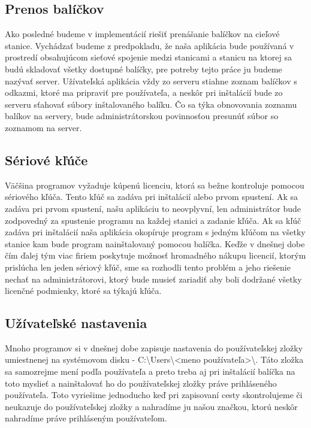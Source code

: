 \subsection{Prenos balíčkov}
Ako posledné budeme v implementácií riešiť prenášanie balíčkov na cieľové stanice. Vychádzať budeme z predpokladu, že naša aplikácia bude používaná v prostredí obsahujúcom sieťové spojenie medzi stanicami a stanicu na ktorej sa budú skladovať všetky dostupné balíčky, pre potreby tejto práce ju budeme nazývať server. Užívateľská aplikácia vždy zo serveru stiahne zoznam balíčkov s odkazmi, ktoré ma pripraviť pre používateľa, a neskôr pri inštalácií bude zo serveru sťahovať súbory inštalovaného balíku. Čo sa týka obnovovania zoznamu balíkov na servery, bude administrátorskou povinnosťou presunúť súbor so zoznamom na server.

\subsection{Sériové kľúče}
Väčšina programov vyžaduje kúpenú licenciu, ktorá sa bežne kontroluje pomocou sériového kľúča. Tento kľúč sa zadáva pri inštalácií alebo prvom spustení. Ak sa zadáva pri prvom spustení, našu aplikáciu to neovplyvní, len administrátor bude zodpovedný za spustenie programu na každej stanici a zadanie kľúča. Ak sa kľúč zadáva pri inštalácií naša aplikácia okopíruje program s jedným kľúčom na všetky stanice kam bude program nainštalovaný pomocou balíčka. Keďže v dnešnej dobe čím ďalej tým viac firiem poskytuje možnosť hromadného nákupu licencií, ktorým prislúcha len jeden sériový kľúč, sme sa rozhodli tento problém a jeho riešenie nechať na administrátorovi, ktorý bude musieť zariadiť aby boli dodržané všetky licenčné podmienky, ktoré sa týkajú kľúča.

\subsection{Užívateľské nastavenia}
Mnoho programov si v dnešnej dobe zapisuje nastavenia do používateľskej zložky umiestnenej na systémovom disku - C:\textbackslash Users\textbackslash\textless meno používateľa\textgreater\textbackslash. Táto zložka sa samozrejme mení podľa používateľa a preto treba aj pri inštalácií balíčka na toto myslieť a nainštalovať ho do používateľskej zložky práve prihláseného používateľa. Toto vyriešime jednoducho keď pri zapisovaní cesty skontrolujeme či neukazuje do používateľskej zložky a nahradíme ju našou značkou, ktorú neskôr nahradíme práve prihláseným používateľom.

